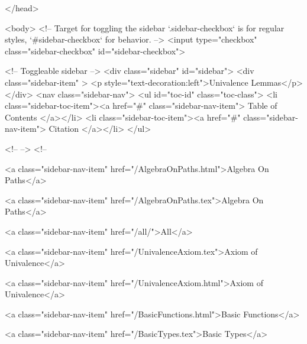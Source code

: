   
</head>




  <body>
    <!-- Target for toggling the sidebar `.sidebar-checkbox` is for regular
     styles, `#sidebar-checkbox` for behavior. -->
<input type="checkbox" class="sidebar-checkbox" id="sidebar-checkbox">

<!-- Toggleable sidebar -->
<div class="sidebar" id="sidebar">
  <div class="sidebar-item" >
    <p style="text-decoration:left">Univalence Lemmas</p>
  </div>
  <nav class="sidebar-nav">
    <ul id="toc-id" class="toc-class">
  <li class="sidebar-toc-item"><a href="#" class="sidebar-nav-item"> Table of Contents </a></li>
  <li class="sidebar-toc-item"><a href="#" class="sidebar-nav-item"> Citation </a></li>
</ul>


    <!--  -->
    <!-- 
      
    
      
    
      
    
      
        
      
    
      
        
          <a class="sidebar-nav-item" href="/AlgebraOnPaths.html">Algebra On Paths</a>
        
      
    
      
        
          <a class="sidebar-nav-item" href="/AlgebraOnPaths.tex">Algebra On Paths</a>
        
      
    
      
        
          <a class="sidebar-nav-item" href="/all/">All</a>
        
      
    
      
        
          <a class="sidebar-nav-item" href="/UnivalenceAxiom.tex">Axiom of Univalence</a>
        
      
    
      
        
          <a class="sidebar-nav-item" href="/UnivalenceAxiom.html">Axiom of Univalence</a>
        
      
    
      
        
          <a class="sidebar-nav-item" href="/BasicFunctions.html">Basic Functions</a>
        
      
    
      
        
          <a class="sidebar-nav-item" href="/BasicTypes.tex">Basic Types</a>
        
